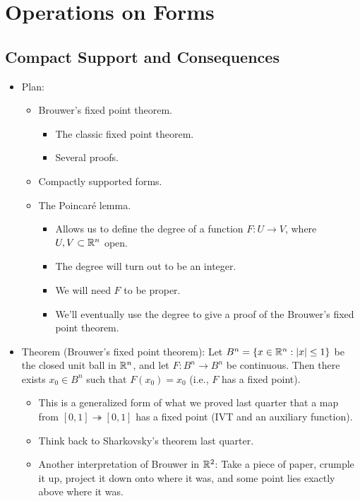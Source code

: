 \documentclass[../notes.tex]{subfiles}
\begin{document}
\chapter{Operations on Forms}
\section{Compact Support and Consequences}
\begin{itemize}
    \item {}Plan:
    \begin{itemize}
        \item Brouwer's fixed point theorem.
        \begin{itemize}
            \item The classic fixed point theorem.
            \item Several proofs.
        \end{itemize}
        \item Compactly supported forms.
        \item The Poincar\'{e} lemma.
        \begin{itemize}
            \item Allows us to define the degree of a function $F:U\to V$, where $U,V\subset\mathbb{R}^n$ open.
            \item The degree will turn out to be an integer.
            \item We will need $F$ to be proper.
            \item We'll eventually use the degree to give a proof of the Brouwer's fixed point theorem.
        \end{itemize}
    \end{itemize}
    \item Theorem (Brouwer's fixed point theorem): Let $B^n=\{x\in\mathbb{R}^n:|x|\leq 1\}$ be the closed unit ball in $\mathbb{R}^n$, and let $F:B^n\to B^n$ be continuous. Then there exists $x_0\in B^n$ such that $F(x_0)=x_0$ (i.e., $F$ has a fixed point).
    \begin{itemize}
        \item This is a generalized form of what we proved last quarter that a map from $[0,1]\twoheadrightarrow[0,1]$ has a fixed point (IVT and an auxiliary function).
        \item Think back to Sharkovsky's theorem last quarter.
        \item Another interpretation of Brouwer in $\mathbb{R}^2$: Take a piece of paper, crumple it up, project it down onto where it was, and some point lies exactly above where it was.

\end{itemize}
\end{itemize}
\end{document}
